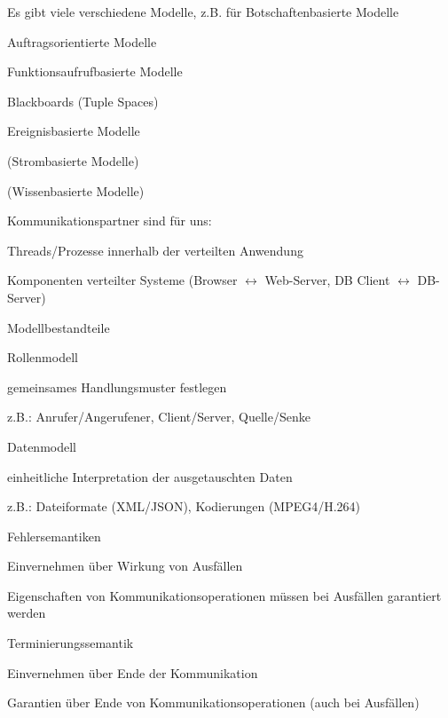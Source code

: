 \documentclass[10pt]{article}
\begin{document}
\begin{itemize*}
Es gibt viele verschiedene Modelle, z.B. für Botschaftenbasierte Modelle
\begin{itemize*}
  \item Auftragsorientierte Modelle
  \item Funktionsaufrufbasierte Modelle
  \item Blackboards (Tuple Spaces)
  \item Ereignisbasierte Modelle
  \item (Strombasierte Modelle)
  \item (Wissenbasierte Modelle)
\end{itemize*}

Kommunikationspartner sind für uns:
\begin{itemize*}
  \item Threads/Prozesse innerhalb der verteilten Anwendung
  \item Komponenten verteilter Systeme (Browser $\leftrightarrow$ Web-Server, DB Client $\leftrightarrow$ DB-Server)
\end{itemize*}

Modellbestandteile
\begin{itemize*}
  \item Rollenmodell
  \begin{itemize*}
    \item gemeinsames Handlungsmuster festlegen
    \item z.B.: Anrufer/Angerufener, Client/Server, Quelle/Senke
  \end{itemize*}
  \item Datenmodell
  \begin{itemize*}
    \item einheitliche Interpretation der ausgetauschten Daten
    \item z.B.: Dateiformate (XML/JSON), Kodierungen (MPEG4/H.264)
  \end{itemize*}
  \item Fehlersemantiken
  \begin{itemize*}
    \item Einvernehmen über Wirkung von Ausfällen
    \item Eigenschaften von Kommunikationsoperationen müssen bei Ausfällen garantiert werden
  \end{itemize*}
  \item Terminierungssemantik
  \begin{itemize*}
    \item Einvernehmen über Ende der Kommunikation
    \item Garantien über Ende von Kommunikationsoperationen (auch bei Ausfällen)
  \end{itemize*}
\end{itemize*}


\end{itemize*}
\end{document}
